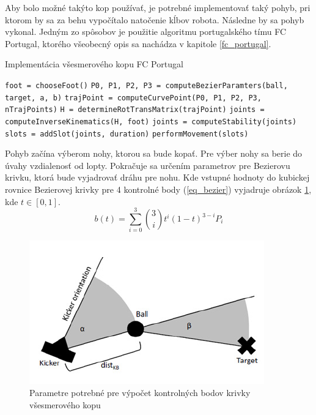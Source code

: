 Aby bolo možné takýto kop používať, je potrebné implementovať taký pohyb, pri ktorom by sa za behu vypočítalo natočenie kĺbov robota. Následne by sa pohyb vykonal. Jedným zo spôsobov je použitie algoritmu portugalského tímu FC Portugal\cite{fc_portugal}, ktorého všeobecný opis sa nachádza v kapitole \ref{fc_portugal}.

\begin{algorithm}
	\caption{Implementácia všesmerového kopu FC Portugal \cite{fc_portugal}}\label{} 
	\begin{algorithmic}
		\STATE \texttt{foot = chooseFoot()}
		\STATE \texttt{P0, P1, P2, P3 = computeBezierParamters(ball, target, a, b)}
			\STATE \texttt{trajPoint = computeCurvePoint(P0, P1, P2, P3, nTrajPoints)}
			\STATE \texttt{H = determineRotTransMatrix(trajPoint)}
			\STATE \texttt{joints = computeInverseKinematics(H, foot)}
			\STATE \texttt{joints = computeStability(joints)}
			\STATE \texttt{slots = addSlot(joints, duration)}
		\ENDFOR
		\STATE \texttt{performMovement(slots)}
	\end{algorithmic}
\end{algorithm}

Pohyb začína výberom nohy, ktorou sa bude kopať. Pre výber nohy sa berie do úvahy vzdialenosť od lopty. Pokračuje sa určením parametrov pre Bezierovu krivku, ktorá bude vyjadrovať dráhu pre nohu. Kde vstupné hodnoty do kubickej rovnice Bezierovej krivky pre 4 kontrolné body (\ref{eq_bezier}) vyjadruje obrázok \ref{pic_kick_arch_fc_portugal_params}, kde $t \in [0,1]$.
\begin{equation}\label{eq_bezier}
	b(t) = \sum_{i = 0}^{3}
	{
		{3 \choose i} t^i {(1 - t)}^{3 - i} P_i
	}
\end{equation}

\begin{figure}[H]
	\center
	\includegraphics[scale=1]{./data/kick_arch_fc_portugal_params}
	\caption{Parametre potrebné pre výpočet kontrolných bodov krivky všesmerového kopu \cite{fc_portugal}}
	\label{pic_kick_arch_fc_portugal_params}
\end{figure}

